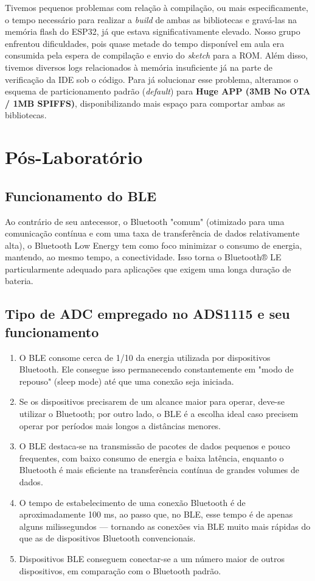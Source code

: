 \documentclass[a4paper,oneside,10pt]{article}
\begin{document}
Tivemos pequenos problemas com relação à compilação, ou mais especificamente, o tempo necessário para realizar a \textit{build} de ambas as bibliotecas e gravá-las na memória flash do ESP32, já que estava significativamente elevado. Nosso grupo enfrentou dificuldades, pois quase metade do tempo disponível em aula era consumida pela espera de compilação e envio do \textit{sketch} para a ROM. Além disso, tivemos diversos logs relacionados à memória insuficiente já na parte de verificação da IDE sob o código. Para já solucionar esse problema, alteramos o esquema de particionamento padrão (\textit{default}) para \textbf{Huge APP (3MB No OTA / 1MB SPIFFS)}, disponibilizando mais espaço para comportar ambas as bibliotecas.

\section{Pós-Laboratório}

\subsection{Funcionamento do BLE}
Ao contrário de seu antecessor, o Bluetooth "comum" (otimizado para uma comunicação contínua e com uma taxa de transferência de dados relativamente alta), o Bluetooth Low Energy tem como foco minimizar o consumo de energia, mantendo, ao mesmo tempo, a conectividade. Isso torna o Bluetooth® LE particularmente adequado para aplicações que exigem uma longa duração de bateria.

\subsection{Tipo de ADC empregado no ADS1115 e seu funcionamento}
\begin{enumerate}
	\item O BLE consome cerca de 1/10 da energia utilizada por dispositivos Bluetooth. Ele consegue isso permanecendo constantemente em "modo de repouso" (sleep mode) até que uma conexão seja iniciada.
	\item Se os dispositivos precisarem de um alcance maior para operar, deve-se utilizar o Bluetooth; por outro lado, o BLE é a escolha ideal caso precisem operar por períodos mais longos a distâncias menores.
	\item O BLE destaca-se na transmissão de pacotes de dados pequenos e pouco frequentes, com baixo consumo de energia e baixa latência, enquanto o Bluetooth é mais eficiente na transferência contínua de grandes volumes de dados.
	\item O tempo de estabelecimento de uma conexão Bluetooth é de aproximadamente 100 ms, ao passo que, no BLE, esse tempo é de apenas alguns milissegundos — tornando as conexões via BLE muito mais rápidas do que as de dispositivos Bluetooth convencionais.
	\item Dispositivos BLE conseguem conectar-se a um número maior de outros dispositivos, em comparação com o Bluetooth padrão.
\end{enumerate}
\end{document}
